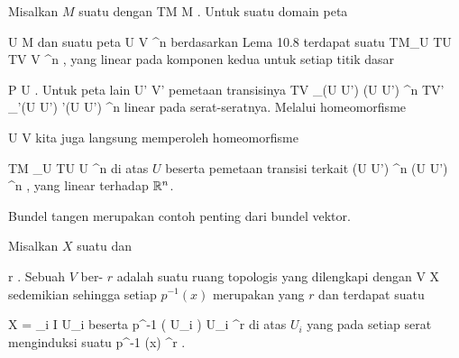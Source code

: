 \setcounter{section}{12}


Misalkan $M$ suatu
dengan
 {TM} {M
} {.}
Untuk suatu domain peta

\mavergleichskette
{\vergleichskette
{ U
}
{ \subseteq }{ M
}
{  }{
}
{    }{
}
{   }{
}
}
{}{}{}
dan suatu peta
\maabbdisp {\alpha} { U } { V \subseteq \R^n
} {}
berdasarkan
Lema 10.8
terdapat suatu
 {TM\vert_U \cong TU} { TV \cong V \times \R^n
} {,}
yang linear pada komponen kedua untuk setiap titik dasar

\mavergleichskette
{\vergleichskette
{ P
}
{ \in }{ U
}
{  }{
}
{    }{
}
{   }{
}
}
{}{}{}
. Untuk peta lain
 {U'} {V'
} {}
pemetaan transisinya
\maabbdisp {} {TV \vert_{\alpha(U \cap U') }  \cong \alpha(U \cap U') \times \R^n } { TV' \vert_{\alpha'(U \cap U') }  \cong \alpha'(U \cap U') \times \R^n
} {}
linear pada serat-seratnya. Melalui homeomorfisme

\mavergleichskette
{\vergleichskette
{ U
}
{ \cong }{ V
}
{  }{
}
{    }{
}
{   }{
}
}
{}{}{}
kita juga langsung memperoleh homeomorfisme

\mavergleichskettedisp
{\vergleichskette
{ TM \vert_U \cong TU
}
{ \cong} { U \times \R^n
}
{ } {
}
{ } {
}
{ } {
}
}
{}{}{}
di atas $U$ beserta pemetaan transisi terkait
\maabbdisp {} {(U \cap U') \times \R^n } { (U \cap U') \times \R^n
} {,}
yang linear terhadap ${\mathbb R}^n$.

Bundel tangen merupakan contoh penting dari bundel vektor.

{}
{

Misalkan $X$ suatu
dan

\mavergleichskette
{\vergleichskette
{r
}
{ \in }{\N
}
{  }{
}
{    }{
}
{   }{
}
}
{}{}{.}
Sebuah
$V$ ber-
$r$ adalah suatu ruang topologis yang dilengkapi dengan
 { V } { X
} {}
sedemikian sehingga setiap
$p^{-1}(x)$ merupakan
yang
$r$ dan terdapat suatu

\mavergleichskette
{\vergleichskette
{X
}
{ = }{ \bigcup_{i \in I} U_i
}
{  }{
}
{    }{
}
{   }{
}
}
{}{}{}
beserta
 {p^{-1} \left(  U_i  \right) } { U_i \times \R^r
} {}
di atas $U_i$ yang pada setiap serat menginduksi suatu
 {p^{-1} (x) } { \R^r
} {}
.

}

